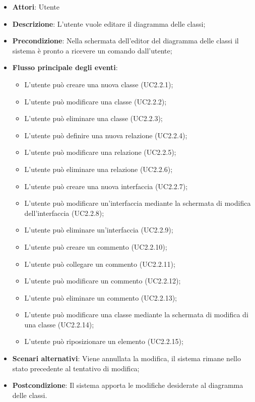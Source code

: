 \documentclass[../AnalisiDeiRequisiti.tex]{subfiles}
\begin{document}
	\begin{itemize}
		\item \textbf{Attori}: Utente
		\item \textbf{Descrizione}: L'utente vuole editare il diagramma delle classi;
		\item \textbf{Precondizione}: Nella schermata dell'editor del diagramma delle classi il sistema è pronto a ricevere un comando dall'utente;
		\item \textbf{Flusso principale degli eventi}: \begin{itemize}
			\item L'utente può creare una nuova classe (UC2.2.1);
			\item L'utente può modificare una classe (UC2.2.2);
			\item L'utente può eliminare una classe (UC2.2.3);
			\item L'utente può definire una nuova relazione (UC2.2.4);
			\item L'utente può modificare una relazione (UC2.2.5);
			\item L'utente può eliminare una relazione (UC2.2.6);
			\item L'utente può creare una nuova interfaccia (UC2.2.7);
			\item L'utente può modificare un'interfaccia mediante la schermata di modifica dell'interfaccia (UC2.2.8);
			\item L'utente può eliminare un'interfaccia (UC2.2.9);
			\item L'utente può creare un commento (UC2.2.10);
			\item L'utente può collegare un commento (UC2.2.11);
			\item L'utente può modificare un commento (UC2.2.12);
			\item L'utente può eliminare un commento (UC2.2.13);
			\item L'utente può modificare una classe mediante la schermata di modifica di una classe (UC2.2.14);
			\item L'utente può riposizionare un elemento (UC2.2.15);
		\end{itemize}
		\item \textbf{Scenari alternativi}: Viene annullata la modifica, il sistema rimane nello stato precedente al tentativo di modifica;
		\item \textbf{Postcondizione}: Il sistema apporta le modifiche desiderate al diagramma delle classi.
	\end{itemize}
\end{document}
